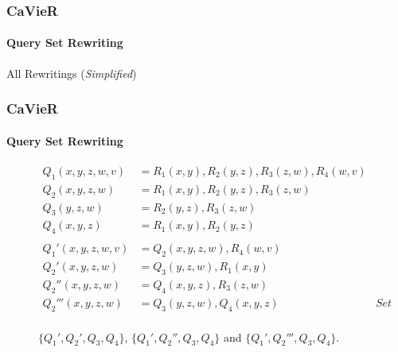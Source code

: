 \documentclass[
	11pt, %
]{beamer}
\begin{document}
\begin{frame}
	\frametitle{CaVieR}
	\framesubtitle{Query Set Rewriting}
	\begin{algorithm}[H]
		\caption{All Rewritings (\textit{Simplified})}\label{alg:AllRewriting}
		\begin{algorithmic}[1]
			\EndIf
			\Else
			\EndIf
			\EndFor
			\EndFunction
		\end{algorithmic}
	\end{algorithm}
\end{frame}

\begin{frame}
	\frametitle{CaVieR}
	\framesubtitle{Query Set Rewriting}
	\begin{figure}
		\begin{align*}
			Q_1(x,y,z,w,v) &= R_1(x,y), R_2(y,z), R_3(z,w), R_4(w,v)&\\
			Q_2(x,y,z,w) &= R_1(x,y), R_2(y,z), R_3(z,w) &\\
			Q_3(y,z,w) &= R_2(y,z), R_3(z,w)&\\
			Q_4(x,y,z) &= R_1(x,y), R_2(y,z)&\\\\
			Q_1'(x,y,z,w,v)& = Q_2(x,y,z,w), R_4(w,v)&\\
			Q_2'(x,y,z,w)& = Q_3(y,z,w), R_1(x,y)&\\
			Q_2''(x,y,z,w)& = Q_4(x,y,z), R_3(z,w)&\\
			Q_2'''(x,y,z,w)& = Q_3(y,z,w), Q_4(x,y,z)& \textit{Set semantics}\\
		\end{align*}
		
		$\{Q_1', Q_2', Q_3, Q_4\}$, $\{Q_1', Q_2'', Q_3, Q_4\}$ and $\{Q_1', Q_2''', Q_3, Q_4\}$.
	\end{figure}
\end{frame}

\end{document}
